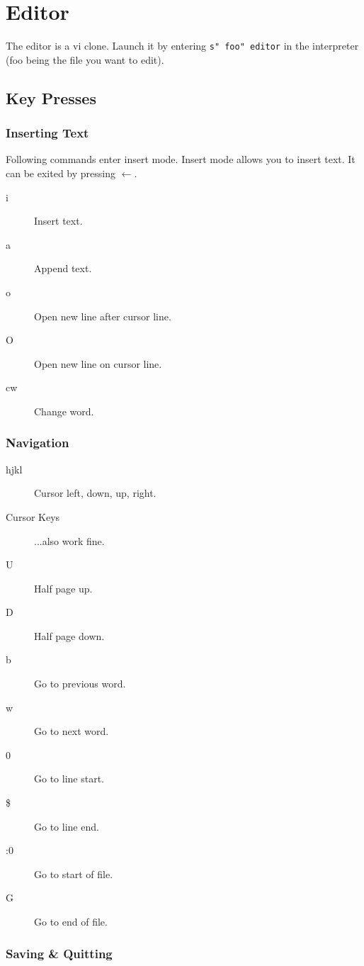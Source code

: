 \chapter{Editor}

The editor is a vi clone. Launch it by entering \texttt{s" foo" editor} in the interpreter (foo being the file you want to edit).

\section{Key Presses}

\subsection{Inserting Text}
Following commands enter insert mode. Insert mode allows you to insert text. It can be exited by pressing $\leftarrow$.
\begin{description}
\item[i] Insert text.
\item[a] Append text.
\item[o] Open new line after cursor line.
\item[O] Open new line on cursor line.
\item[cw] Change word.
\end{description}

\subsection{Navigation}
\begin{description}
\item[hjkl] Cursor left, down, up, right.
\item[Cursor Keys] ...also work fine.
\item[U] Half page up.
\item[D] Half page down.
\item[b] Go to previous word.
\item[w] Go to next word.
\item[0] Go to line start.
\item[\$] Go to line end.
\item[:0] Go to start of file.
\item[G] Go to end of file.
\end{description}

\subsection{Saving \& Quitting}

